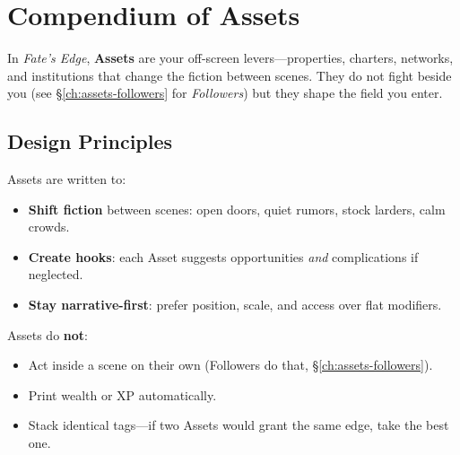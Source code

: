 \chapter{Compendium of Assets}
\label{ch:compendium-assets}

In \textit{Fate’s Edge}, \textbf{Assets} are your off-screen levers—properties, charters, networks, and institutions that change the fiction between scenes. They do not fight beside you (see \S\ref{ch:assets-followers} for \emph{Followers}) but they shape the field you enter.

\section{Design Principles}
Assets are written to:
\begin{itemize}
  \item \textbf{Shift fiction} between scenes: open doors, quiet rumors, stock larders, calm crowds.
  \item \textbf{Create hooks}: each Asset suggests opportunities \emph{and} complications if neglected.
  \item \textbf{Stay narrative-first}: prefer position, scale, and access over flat modifiers.
\end{itemize}

Assets do \textbf{not}:
\begin{itemize}
  \item Act inside a scene on their own (Followers do that, \S\ref{ch:assets-followers}). 
  \item Print wealth or XP automatically.
  \item Stack identical tags—if two Assets would grant the same edge, take the best one. 
\end{itemize}

